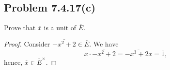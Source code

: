\documentclass[12pt]{article}
\newenvironment{problem}
    {\begin{lrbox}{\mybox}\begin{minipage}{0.98\textwidth}}
    {\end{minipage}\end{lrbox}\begin{center}\framebox[\textwidth]{\usebox{\mybox}}\end{center}}
\theoremstyle{definition}
\newcommand{\<}{\left\langle}
\renewcommand{\>}{\right\rangle}
\newcommand{\conj}{\overline}
\begin{document}
\subsection{Problem 7.4.17(c)}
\begin{problem}
    Prove that $\conj{x}$ is a unit of $\conj{E}$.
\end{problem}

\begin{proof}
    Consider $\conj{-x^2 + 2} \in \conj{E}$. We have
    \[
        \conj{x} \cdot \conj{-x^2 + 2} = \conj{-x^3 + 2x} = \conj{1},
    \]
    hence, $\conj{x} \in \conj{E}^\times$.
    
\end{proof}
\end{document}
